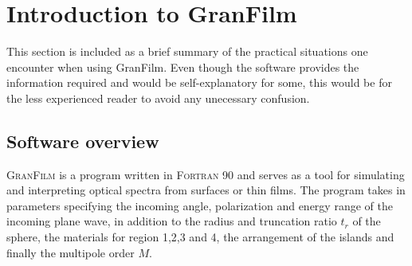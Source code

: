 \section{Introduction to GranFilm}
This section is included as a brief summary of the practical situations one encounter
when using GranFilm. Even though the software provides the information required and would be
self-explanatory for some, this would be for the less experienced reader to avoid any unecessary 
confusion.

\subsection{Software overview}
\textsc{GranFilm} is a program written in \textsc{Fortran 90} and serves as a tool for simulating 
and interpreting optical spectra from surfaces or thin films. The program takes in parameters specifying
the incoming angle, polarization and energy range of the incoming plane wave, in addition to the
radius and truncation ratio $t_r$ of the sphere, the materials for region 1,2,3 and 4,
the arrangement of the islands and finally the multipole order $M$.  

